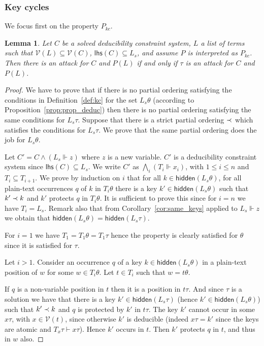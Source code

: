 \documentclass[acmtocl,acmnow]{acmtrans2m}
\newtheorem{lemma}[theorem]{Lemma}
\newcommand{\var}{\mathcal{V}}
\newcommand{\lhs}{\mathsf{lhs}}
\newcommand{\lset}[1]{#1_s}
\newcommand{\hidden}[1]{\mathsf{hidden}({#1})}
\newcommand{\dedsys}[1]{deducibility constraint system}
\begin{document}
\subsubsection{Key cycles} 
We focus first on the property $P_{kc}$.






\begin{lemma}\label{lem:tau_sol_kc}
Let $C$ be a solved \dedsys{}, $L$ a list of terms such that $\var(L)\subseteq\var(C)$,
$\lhs(C)\subseteq\lset{L}$, and assume $P$ is interpreted as $P_{kc}$. Then
there is an attack for $C$ and $P(L)$ if and only if $\tau$ is an attack
for $C$ and $P(L)$.
\end{lemma}
\begin{proof}
We have to prove that if there is no partial ordering satisfying the conditions in Definition~\ref{def:kc} for
the set $\lset{L}\theta$ (according to Proposition~\ref{prop:prop_deduc}) then there is no partial ordering
satisfying the same conditions for $\lset{L}\tau$. Suppose that there is a strict partial ordering $\prec$ which
satisfies the conditions for $\lset{L}\tau$. We prove that the same partial ordering does the job for
$\lset{L}\theta$.


Let $C'=C\wedge(\lset{L}\Vdash z)$ where $z$ is a new variable. $C'$ is a 
\dedsys{} since
$\lhs(C)\subseteq\lset{L}$.
We write $C'$ as $\bigwedge_i(T_i\Vdash x_i)$, with $1\le i\le n$ and $T_i\subseteq T_{i+1}$.
We prove by induction on $i$ that for all $k\in\hidden{\lset{L}\theta}$, for all plain-text occurrences $q$ of $k$ in $T_i\theta$ there is a key
$k'\in\hidden{\lset{L}\theta}$ such that $k'\prec k$ and $k'$ protects $q$ in $T_i\theta$. It is sufficient to prove this since for $i=n$ we have $T_i=\lset{L}$.
Remark also that from Corollary~\ref{cor:same_keys} applied to $\lset{L}\Vdash z$ we obtain that
$\hidden{\lset{L}\theta}=\hidden{\lset{L}\tau}$.

For $i=1$ we have $T_1=T_1\theta=T_1\tau$ hence the property is clearly satisfied for $\theta$ since it is
satisfied for $\tau$.

Let $i>1$. Consider an occurrence $q$ of a key $k\in\hidden{\lset{L}\theta}$ in a plain-text position of $w$
for some $w\in T_i\theta$. Let $t\in T_i$ such that $w=t\theta$.

If $q$ is a non-variable position in $t$ then it is a position in $t\tau$.
And since $\tau$ is a solution we have that there is a key $k'\in\hidden{\lset{L}\tau}$ (hence $k'\in\hidden{\lset{L}\theta}$)
such that $k'\prec k$ and $q$ is protected by $k'$ in $t\tau$. The key $k'$ cannot occur  in some $x\tau$, with
$x\in\var(t)$, since otherwise $k'$ is deducible (indeed $x\tau=k'$ since the keys are atomic and
$T_x\tau\vdash x\tau$). Hence $k'$ occurs in $t$. Then $k'$ protects $q$ in $t$, and thus in $w$ also.



\end{proof}
\end{document}
